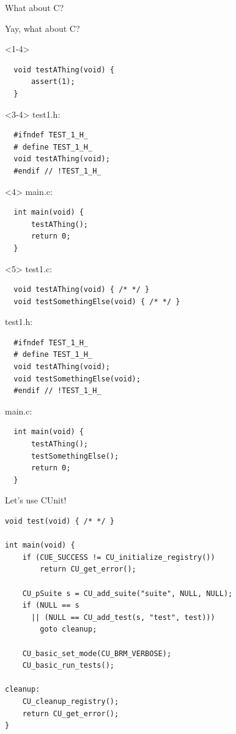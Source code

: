\documentclass[10pt]{beamer}
\begin{document}
\begin{frame}[fragile]{What about C?}

  Yay, what about C?

  \begin{onlyenv}<1-4>
  \begin{lstlisting}
  void testAThing(void) {
      assert(1);
  }
  \end{lstlisting}
  \end{onlyenv}

  \begin{onlyenv}<3-4>
  test1.h:
  \begin{lstlisting}
  #ifndef TEST_1_H_
  # define TEST_1_H_
  void testAThing(void);
  #endif // !TEST_1_H_
  \end{lstlisting}
  \end{onlyenv}

  \begin{onlyenv}<4>
  main.c:
  \begin{lstlisting}
  int main(void) {
      testAThing();
      return 0;
  }
  \end{lstlisting}
  \end{onlyenv}

  \begin{onlyenv}<5>
  test1.c:
  \begin{lstlisting}
  void testAThing(void) { /* */ }
  void testSomethingElse(void) { /* */ }
  \end{lstlisting}

  test1.h:
  \begin{lstlisting}
  #ifndef TEST_1_H_
  # define TEST_1_H_
  void testAThing(void);
  void testSomethingElse(void);
  #endif // !TEST_1_H_
  \end{lstlisting}

  main.c:
  \begin{lstlisting}
  int main(void) {
      testAThing();
      testSomethingElse();
      return 0;
  }
  \end{lstlisting}
  \end{onlyenv}

\end{frame}



\begin{frame}[fragile]{Let's use CUnit!}

  \begin{lstlisting}
void test(void) { /* */ }

int main(void) {
    if (CUE_SUCCESS != CU_initialize_registry())
        return CU_get_error();

    CU_pSuite s = CU_add_suite("suite", NULL, NULL);
    if (NULL == s
      || (NULL == CU_add_test(s, "test", test)))
        goto cleanup;

    CU_basic_set_mode(CU_BRM_VERBOSE);
    CU_basic_run_tests();

cleanup:
    CU_cleanup_registry();
    return CU_get_error();
}
  \end{lstlisting}

\end{frame}
\end{document}
